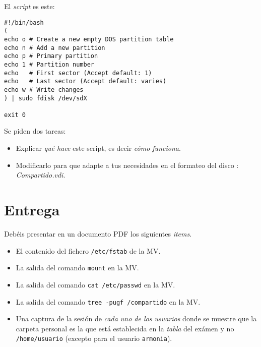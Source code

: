 \documentclass[11pt]{article}
\begin{document}
El \emph{script} es este:

\begin{verbatim}
#!/bin/bash
(
echo o # Create a new empty DOS partition table
echo n # Add a new partition
echo p # Primary partition
echo 1 # Partition number
echo   # First sector (Accept default: 1)
echo   # Last sector (Accept default: varies)
echo w # Write changes
) | sudo fdisk /dev/sdX

exit 0
\end{verbatim}

Se piden dos tareas:

\begin{itemize}
\item Explicar \emph{qué hace} este script, es decir \emph{cómo funciona}.
\item Modificarlo para que adapte a tus necesidades en el formateo del disco : \emph{Compartido.vdi}.
\end{itemize}


\section{Entrega}
\label{sec-9}

Debéis presentar en un documento PDF los siguientes \emph{items}.

\begin{itemize}
\item El contenido del fichero \verb~/etc/fstab~ de la MV.
\item La salida del comando \verb~mount~ en la MV.
\item La salida del comando \verb~cat /etc/passwd~ en la MV.
\item La salida del comando \verb~tree -pugf /compartido~ en la MV.
\item Una captura de la sesión de \emph{cada uno de los usuarios} donde se muestre que
la carpeta personal es la que está establecida en la \emph{tabla} del exámen y no
\verb~/home/usuario~ (excepto para el usuario \verb~armonia~).
\end{itemize}
\end{document}
